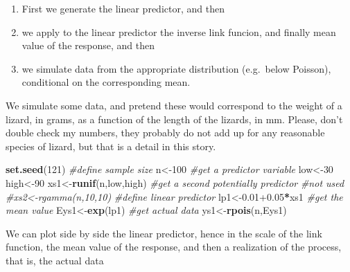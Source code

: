 \documentclass[
]{book}
\newenvironment{Shaded}{\begin{snugshade}}{\end{snugshade}}
\newcommand{\CommentTok}[1]{\textcolor[rgb]{0.56,0.35,0.01}{\textit{#1}}}
\newcommand{\DecValTok}[1]{\textcolor[rgb]{0.00,0.00,0.81}{#1}}
\newcommand{\FloatTok}[1]{\textcolor[rgb]{0.00,0.00,0.81}{#1}}
\newcommand{\FunctionTok}[1]{\textcolor[rgb]{0.13,0.29,0.53}{\textbf{#1}}}
\newcommand{\NormalTok}[1]{#1}
\newcommand{\OtherTok}[1]{\textcolor[rgb]{0.56,0.35,0.01}{#1}}
\newcommand{\SpecialCharTok}[1]{\textcolor[rgb]{0.81,0.36,0.00}{\textbf{#1}}}
\providecommand{\tightlist}{%
  \setlength{\itemsep}{0pt}\setlength{\parskip}{0pt}}
\begin{document}
\begin{enumerate}
\def\labelenumi{\arabic{enumi}.}
\tightlist
\item
  First we generate the linear predictor, and then
\item
  we apply to the linear predictor the inverse link funcion, and finally
  mean value of the response, and then
\item
  we simulate data from the appropriate distribution (e.g.~below Poisson), conditional on the corresponding mean.
\end{enumerate}

We simulate some data, and pretend these would correspond to the weight of a lizard, in grams, as a function of the length of the lizards, in mm. Please, don't double check my numbers, they probably do not add up for any reasonable species of lizard, but that is a detail in this story.

\begin{Shaded}
\begin{Highlighting}[]
\FunctionTok{set.seed}\NormalTok{(}\DecValTok{121}\NormalTok{)}
\CommentTok{\#define sample size}
\NormalTok{n}\OtherTok{\textless{}{-}}\DecValTok{100}
\CommentTok{\#get a predictor variable}
\NormalTok{low}\OtherTok{\textless{}{-}}\DecValTok{30}
\NormalTok{high}\OtherTok{\textless{}{-}}\DecValTok{90}
\NormalTok{xs1}\OtherTok{\textless{}{-}}\FunctionTok{runif}\NormalTok{(n,low,high)}
\CommentTok{\#get a second potentially predictor}
\CommentTok{\#not used}
\CommentTok{\#xs2\textless{}{-}rgamma(n,10,10)}
\CommentTok{\#define linear predictor}
\NormalTok{lp1}\OtherTok{\textless{}{-}}\FloatTok{0.01+0.05}\SpecialCharTok{*}\NormalTok{xs1}
\CommentTok{\#get the mean value}
\NormalTok{Eys1}\OtherTok{\textless{}{-}}\FunctionTok{exp}\NormalTok{(lp1)}
\CommentTok{\#get actual data}
\NormalTok{ys1}\OtherTok{\textless{}{-}}\FunctionTok{rpois}\NormalTok{(n,Eys1)}
\end{Highlighting}
\end{Shaded}

We can plot side by side the linear predictor, hence in the scale of the link function, the mean value of the response, and then a realization of the process, that is, the actual data
\end{document}
